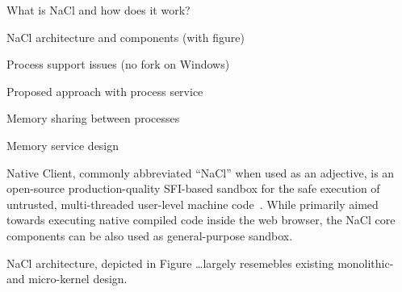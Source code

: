 \begin{structure}
  \item What is NaCl and how does it work?
  \item NaCl architecture and components (with figure)
  \item Process support issues (\eg no fork on Windows)
  \item Proposed approach with process service
  \item Memory sharing between processes
  \item Memory service design
\end{structure}

Native Client, commonly abbreviated ``NaCl'' when used as an adjective,
is an open-source production-quality SFI-based sandbox for the safe
execution of untrusted, multi-threaded user-level machine
code~\cite{yee:ieee-sp09,sehr:usenix-sec10,ansel:pldi11}. While
primarily aimed towards executing native compiled code inside the web
browser, the NaCl core components can be also used as
general-purpose sandbox.

NaCl architecture, depicted in Figure \ldots largely resemebles
existing monolithic- and micro-kernel design.


